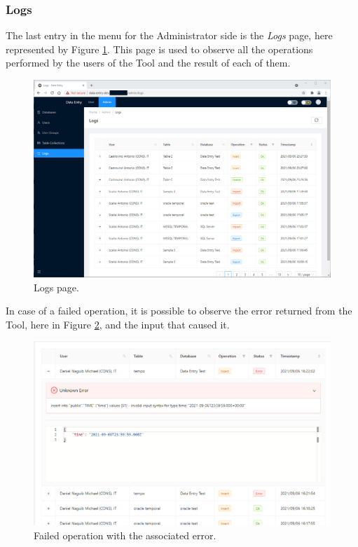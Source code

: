 \subsubsection{Logs}
The last entry in the menu for the Administrator side is the \emph{Logs} page, here represented by Figure \ref{fig:logs}. This page is used to observe all the operations performed by the users of the Tool and the result of each of them.
\begin{figure}[!htb]
    \centering
    \includegraphics[width=15.8cm]{chapters/images/ch_3/FE/Admin/logs.png}
    \caption{Logs page.}
    \label{fig:logs}
\end{figure}

In case of a failed operation, it is possible to observe the error returned from the Tool, here in Figure \ref{fig:err}, and the input that caused it.

\begin{figure}[!htb]
    \centering
    \includegraphics[width=15.8cm]{chapters/images/ch_3/FE/Admin/error.png}
    \caption{Failed operation with the associated error.}
    \label{fig:err}
\end{figure}

